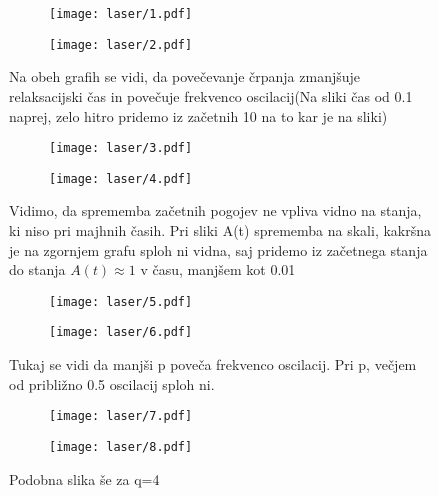 \documentclass{article}
\begin{document}
\begin{figure}[H]
\centering
\begin{subfigure}{.49\textwidth}
\texttt{[image: laser/1.pdf]}
\end{subfigure}
\begin{subfigure}{.49\textwidth}
\texttt{[image: laser/2.pdf]}
\end{subfigure}
\caption*{Na obeh grafih se vidi, da povečevanje črpanja zmanjšuje relaksacijski čas in povečuje frekvenco oscilacij(Na sliki čas od 0.1 naprej, zelo hitro pridemo iz začetnih 10 na to kar je na sliki)}
\end{figure}
\begin{figure}[H]
\centering
\begin{subfigure}{.49\textwidth}
\texttt{[image: laser/3.pdf]}
\end{subfigure}
\begin{subfigure}{.49\textwidth}
\texttt{[image: laser/4.pdf]}
\end{subfigure}
\caption*{Vidimo, da sprememba začetnih pogojev ne vpliva vidno na stanja, ki niso pri majhnih časih. Pri sliki A(t) sprememba na skali, kakršna je na zgornjem grafu sploh ni vidna, saj pridemo iz začetnega stanja do stanja $A(t) \approx 1$ v času, manjšem kot 0.01}
\end{figure}
\begin{figure}[H]
\centering
\begin{subfigure}{.49\textwidth}
\texttt{[image: laser/5.pdf]}
\end{subfigure}
\begin{subfigure}{.49\textwidth}
\texttt{[image: laser/6.pdf]}
\end{subfigure}
\caption*{Tukaj se vidi da manjši p poveča frekvenco oscilacij. Pri p, večjem od približno 0.5 oscilacij sploh ni.}
\end{figure}

\begin{figure}[H]
\centering
\begin{subfigure}{.49\textwidth}
\texttt{[image: laser/7.pdf]}
\end{subfigure}
\begin{subfigure}{.49\textwidth}
\texttt{[image: laser/8.pdf]}
\end{subfigure}
\caption*{Podobna slika še za q=4}
\end{figure}
\end{document}
